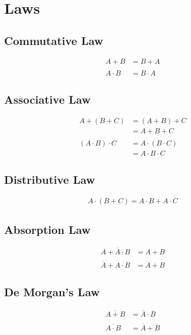 \documentclass[a4paper, 12pt ]{article}
\begin{document}
   \section*{Laws}
   \subsection*{Commutative Law}
       \begin{align*}
           A + B &= B + A\\\\
           A \cdot B &= B \cdot A
       \end{align*}
   \subsection*{Associative Law}
       \begin{align*}
          A + (B + C) &= (A + B) + C\\
                              &= A + B + C\\\\
          (A \cdot B) \cdot C &= A \cdot (B \cdot C)\\
                                         &= A \cdot B \cdot C
      \end{align*}
   \subsection*{Distributive Law}
      \begin{align*}
         A \cdot (B + C) = A \cdot B + A \cdot C
      \end{align*}
   \subsection*{Absorption Law}
      \begin{align*}
         A + \overline{A} \cdot B &= A + B\\\\
         \overline{A} + A \cdot B &= \overline{A} + B
      \end{align*}
   \subsection*{De Morgan's Law}
      \begin{align*}
         \overline{A + B} &= \overline{A} \cdot \overline{B}\\\\
         \overline{A \cdot B} &= \overline{A} + \overline{B}
      \end{align*}
\end{document}
